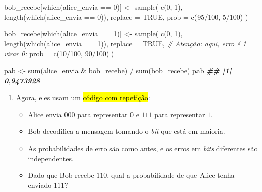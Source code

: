 \documentclass[
  11pt]{report}
\newenvironment{Shaded}{\begin{snugshade}}{\end{snugshade}}
\newcommand{\AttributeTok}[1]{\textcolor[rgb]{0.77,0.63,0.00}{#1}}
\newcommand{\CommentTok}[1]{\textcolor[rgb]{0.56,0.35,0.01}{\textit{#1}}}
\newcommand{\ConstantTok}[1]{\textcolor[rgb]{0.00,0.00,0.00}{#1}}
\newcommand{\DecValTok}[1]{\textcolor[rgb]{0.00,0.00,0.81}{#1}}
\newcommand{\DocumentationTok}[1]{\textcolor[rgb]{0.56,0.35,0.01}{\textbf{\textit{#1}}}}
\newcommand{\FunctionTok}[1]{\textcolor[rgb]{0.00,0.00,0.00}{#1}}
\newcommand{\NormalTok}[1]{#1}
\newcommand{\OtherTok}[1]{\textcolor[rgb]{0.56,0.35,0.01}{#1}}
\newcommand{\SpecialCharTok}[1]{\textcolor[rgb]{0.00,0.00,0.00}{#1}}
\renewenvironment{Shaded}{
    \begin{mdframed}[%
      roundcorner=2pt,%
      innerleftmargin=5pt,%
      innerrightmargin=5pt,%
      topline=true,%
      leftline=true,%
      rightline=true,%
      bottomline=true,%
      linewidth=0.5pt,%
      linecolor=black!20,%
      backgroundcolor=black!2,%
      skipabove=2ex,%
      skipbelow=2.5ex%
    ]%
  }
  {
    \end{mdframed}
  }
\begin{document}
\begin{itemize}
\begin{Shaded}
\begin{Highlighting}[]
\NormalTok{bob\_recebe[}\FunctionTok{which}\NormalTok{(alice\_envia }\SpecialCharTok{==} \DecValTok{0}\NormalTok{)] }\OtherTok{\textless{}{-}} 
  \FunctionTok{sample}\NormalTok{(}
    \FunctionTok{c}\NormalTok{(}\DecValTok{0}\NormalTok{, }\DecValTok{1}\NormalTok{), }
    \FunctionTok{length}\NormalTok{(}\FunctionTok{which}\NormalTok{(alice\_envia }\SpecialCharTok{==} \DecValTok{0}\NormalTok{)),}
    \AttributeTok{replace =} \ConstantTok{TRUE}\NormalTok{,}
    \AttributeTok{prob =} \FunctionTok{c}\NormalTok{(}\DecValTok{95}\SpecialCharTok{/}\DecValTok{100}\NormalTok{, }\DecValTok{5}\SpecialCharTok{/}\DecValTok{100}\NormalTok{)}
\NormalTok{  )}

\NormalTok{bob\_recebe[}\FunctionTok{which}\NormalTok{(alice\_envia }\SpecialCharTok{==} \DecValTok{1}\NormalTok{)] }\OtherTok{\textless{}{-}} 
  \FunctionTok{sample}\NormalTok{(}
    \FunctionTok{c}\NormalTok{(}\DecValTok{0}\NormalTok{, }\DecValTok{1}\NormalTok{), }
    \FunctionTok{length}\NormalTok{(}\FunctionTok{which}\NormalTok{(alice\_envia }\SpecialCharTok{==} \DecValTok{1}\NormalTok{)),}
    \AttributeTok{replace =} \ConstantTok{TRUE}\NormalTok{,}
    \CommentTok{\# Atenção: aqui, erro é 1 virar 0:}
    \AttributeTok{prob =} \FunctionTok{c}\NormalTok{(}\DecValTok{10}\SpecialCharTok{/}\DecValTok{100}\NormalTok{, }\DecValTok{90}\SpecialCharTok{/}\DecValTok{100}\NormalTok{)  }
\NormalTok{  )}

\NormalTok{pab }\OtherTok{\textless{}{-}} \FunctionTok{sum}\NormalTok{(alice\_envia }\SpecialCharTok{\&}\NormalTok{ bob\_recebe) }\SpecialCharTok{/} \FunctionTok{sum}\NormalTok{(bob\_recebe)}
\NormalTok{pab}
\DocumentationTok{\#\# [1] 0,9473928}
\end{Highlighting}
\end{Shaded}
\end{itemize}

\begin{rmdbox}

\begin{enumerate}
\def\labelenumi{\alph{enumi}.}
\setcounter{enumi}{1}
\item
  Agora, eles usam um {\hl{código com repetição}}:

  \begin{itemize}
  \item
    Alice envia $000$ para representar $0$ e $111$ para representar $1$.
  \item
    Bob decodifica a mensagem tomando o \emph{bit} que está em maioria.
  \item
    As probabilidades de erro são como antes, e os erros em \emph{bits} diferentes são independentes.
  \item
    Dado que Bob recebe $110$, qual a probabilidade de que Alice tenha enviado $111$?
  \end{itemize}
\end{enumerate}

\end{rmdbox}
\end{document}
